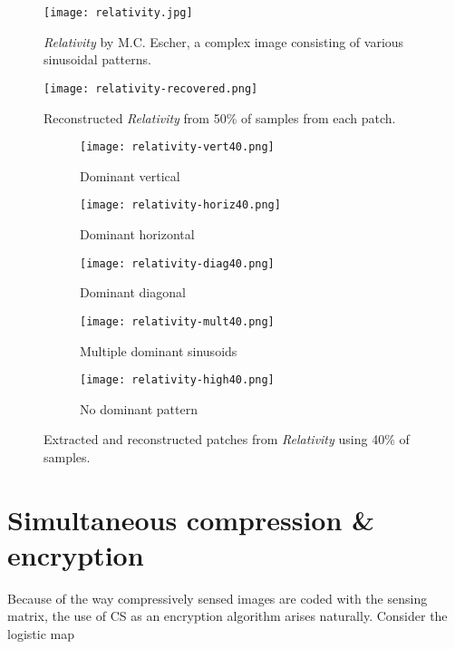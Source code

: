 \begin{figure}[htb]
	\texttt{[image: relativity.jpg]}
	\caption{\textit{Relativity} by M.C. Escher, a complex image consisting of various sinusoidal patterns.}
	\label{fig:relativity}
\end{figure}

\begin{figure}[htb]
	\texttt{[image: relativity-recovered.png]}
	\caption{Reconstructed \textit{Relativity} from 50\% of samples from each patch.}
	\label{fig:relativity-recovered}
\end{figure}

\begin{figure}[htb]
	\centering
	\begin{subfigure}{\textwidth}
		\centering
		\texttt{[image: relativity-vert40.png]}
		\caption{Dominant vertical}
		\label{fig:relativity-vert40}
	\end{subfigure}
	\begin{subfigure}{\textwidth}
		\centering
		\texttt{[image: relativity-horiz40.png]}
		\caption{Dominant horizontal}
		\label{fig:relativity-horiz40}
	\end{subfigure}
	\begin{subfigure}{\textwidth}
		\centering
		\texttt{[image: relativity-diag40.png]}
		\caption{Dominant diagonal}
		\label{fig:relativity-diag40}
	\end{subfigure}
	\begin{subfigure}{\textwidth}
		\centering
		\texttt{[image: relativity-mult40.png]}
		\caption{Multiple dominant sinusoids}
		\label{fig:relativity-mult40}
	\end{subfigure}
	\begin{subfigure}{\textwidth}
		\centering
		\texttt{[image: relativity-high40.png]}
		\caption{No dominant pattern}
		\label{fig:relativity-high40}
	\end{subfigure}
	\caption{Extracted and reconstructed patches from \textit{Relativity} using 40\% of samples.}
	\label{fig:relativity-dominant-slices}
\end{figure}


\section{Simultaneous compression \& encryption}
Because of the way compressively sensed images are coded with the sensing matrix, the use of CS as an encryption algorithm arises naturally. Consider the logistic map

